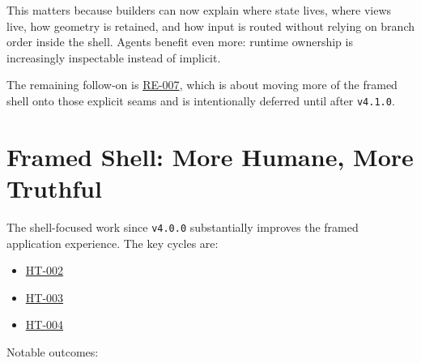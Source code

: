 This matters because builders can now explain where state lives, where views live, how geometry is retained, and how input is routed without relying on branch order inside the shell. Agents benefit even more: runtime ownership is increasingly inspectable instead of implicit.

The remaining follow-on is \href{https://github.com/flyingrobots/bijou/blob/cbd70612140e7a450d764b3c7be1c6af878b99bc/docs/method/graveyard/legacy-backlog/up-next/RE-007-migrate-framed-shell-onto-runtime-engine-seams.md}{RE-007}, which is about moving more of the framed shell onto those explicit seams and is intentionally deferred until after \texttt{v\allowbreak{}4\allowbreak{}.\allowbreak{}1\allowbreak{}.\allowbreak{}0}.

\section{Framed Shell: More Humane, More Truthful}\label{record-275-framed-shell-more-humane-more-truthful}

The shell-focused work since \texttt{v\allowbreak{}4\allowbreak{}.\allowbreak{}0\allowbreak{}.\allowbreak{}0} substantially improves the framed application experience. The key cycles are:

\begin{itemize}
\tightlist
\item
  \href{https://github.com/flyingrobots/bijou/blob/cbd70612140e7a450d764b3c7be1c6af878b99bc/docs/design/HT-002-layered-focus-and-interaction.md}{HT-002}
\item
  \href{https://github.com/flyingrobots/bijou/blob/cbd70612140e7a450d764b3c7be1c6af878b99bc/docs/design/HT-003-implement-layer-stack-and-input-map-routing.md}{HT-003}
\item
  \href{https://github.com/flyingrobots/bijou/blob/cbd70612140e7a450d764b3c7be1c6af878b99bc/docs/design/HT-004-promote-explicit-layer-objects-and-richer-shell-introspection.md}{HT-004}
\end{itemize}

Notable outcomes:

